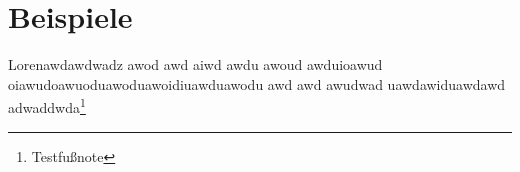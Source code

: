 \section{Beispiele}\label{sec:beispiele}

Lorenawdawdwadz awod awd aiwd awdu awoud awduioawud oiawudoawuoduawoduawoidiuawduawodu awd awd awudwad uawdawiduawdawd adwaddwda\footnote{Testfußnote}











